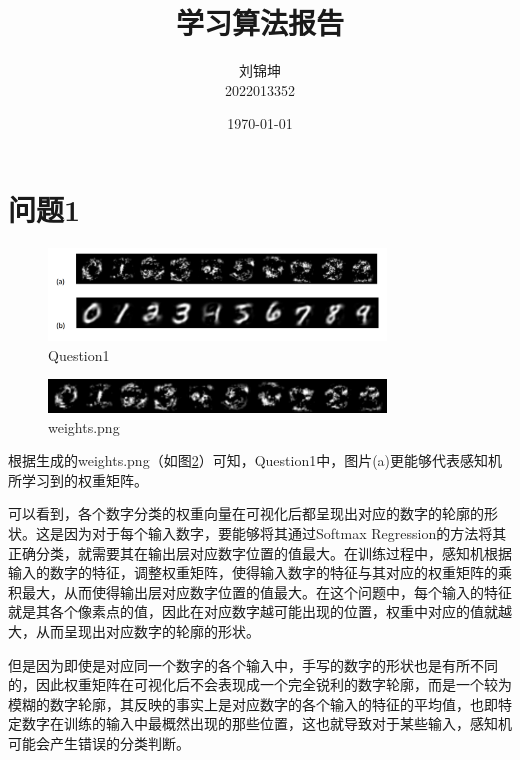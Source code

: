 \documentclass[UTF8]{ctexart}
\title{学习算法报告}
\author{
    刘锦坤
    \\2022013352}
\date{\today}
\begin{document}
\fancyfoot[C]{\thepage}

\maketitle
\tableofcontents

\section{问题1}

\begin{figure}[h]
    \centering
    \includegraphics[width=0.8\textwidth]{./image/ab.png}
    \caption{Question1}
    \label{fig:Question1}
\end{figure}

\begin{figure}[h]
    \centering
    \includegraphics[width=0.8\textwidth]{./image/weights.png}
    \caption{weights.png}
    \label{fig:weights}
\end{figure}

\indent 根据生成的weights.png（如图\ref{fig:weights}）可知，Question1中，图片(a)更能够代表感知机所学习到的权重矩阵。

\indent 可以看到，各个数字分类的权重向量在可视化后都呈现出对应的数字的轮廓的形状。这是因为对于每个输入数字，要能够将其通过Softmax Regression的方法将其正确分类，就需要其在输出层对应数字位置的值最大。在训练过程中，感知机根据输入的数字的特征，调整权重矩阵，使得输入数字的特征与其对应的权重矩阵的乘积最大，从而使得输出层对应数字位置的值最大。在这个问题中，每个输入的特征就是其各个像素点的值，因此在对应数字越可能出现的位置，权重中对应的值就越大，从而呈现出对应数字的轮廓的形状。

\indent 但是因为即使是对应同一个数字的各个输入中，手写的数字的形状也是有所不同的，因此权重矩阵在可视化后不会表现成一个完全锐利的数字轮廓，而是一个较为模糊的数字轮廓，其反映的事实上是对应数字的各个输入的特征的平均值，也即特定数字在训练的输入中最概然出现的那些位置，这也就导致对于某些输入，感知机可能会产生错误的分类判断。
\end{document}
